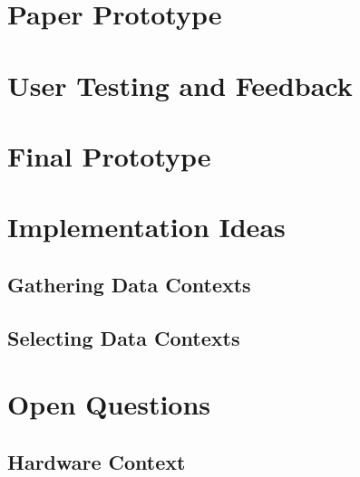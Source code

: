 \documentclass[runningheads]{llncs}
\begin{document}
\section{Paper Prototype} \label{sec:PAPER_PROTOTYPE}

\section{User Testing and Feedback} \label{sec:USER_TESTING}

\section{Final Prototype} \label{sec:FINAL_PROTOTYPE}

\section{Implementation Ideas} \label{sec:IMPLEMENTATION_IDEAS}
\subsection{Gathering Data Contexts}
\subsection{Selecting Data Contexts}

\section{Open Questions} \label{sec:OPEN_QUESTIONS}
\subsection{Hardware Context}
\end{document}
